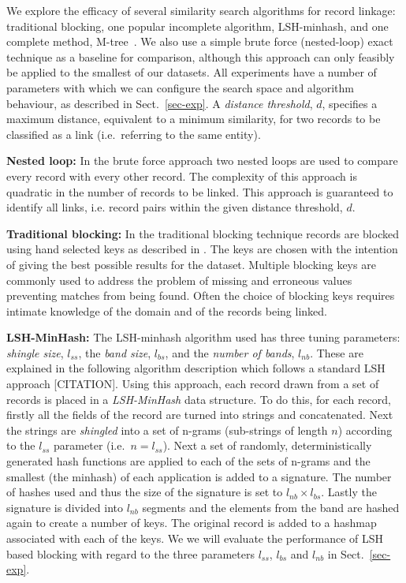\documentclass{llncs}
\begin{document}
We explore the efficacy of several similarity search algorithms for
record linkage: traditional blocking, one popular incomplete algorithm, LSH-minhash, and one complete
method, M-tree~\cite{paolociaccia2m}. We also use a simple brute force
(nested-loop) exact technique as a baseline for comparison, although
this approach can only feasibly be applied to the smallest of our
datasets. All experiments have a number of parameters with which we can
configure the search space and algorithm behaviour, as described in
Sect.~\ref{sec-exp}. A \emph{distance threshold}, $d$, specifies a
maximum distance, equivalent to a minimum similarity, for two records to
be classified as a link (i.e.\ referring to the same entity).

\smallskip
\textbf{Nested loop:}
In the brute force approach two nested loops are used to compare every 
record with every other record. The complexity of this 
approach is quadratic in the number of records to
be linked. This approach is guaranteed to identify all links, i.e. record pairs within the given distance threshold, $d$.

\smallskip
\textbf{Traditional  blocking:}
In the traditional blocking technique records are blocked using hand selected keys as described in \cite{Chr12b}. The keys are chosen with the intention of giving the best possible results for the dataset. Multiple blocking keys are commonly used to address the problem of missing and erroneous values preventing matches from being found. Often the choice of blocking keys requires intimate knowledge of the domain and of the records being linked.


\smallskip
\textbf{LSH-MinHash:}
The LSH-minhash algorithm used has three tuning parameters:
\emph{shingle size}, $l_{ss}$, the \emph{band size}, $l_{bs}$, and the
\emph{number of bands}, $l_{nb}$.
These are explained in the following algorithm description which follows a standard LSH approach [CITATION].
Using this approach, each record drawn from a set of records is placed in a \emph{LSH-MinHash} data structure.
To do this, for each record, firstly all the fields of the record are turned into strings and 
concatenated. Next the strings are \emph{shingled} into a set of
n-grams (sub-strings of length $n$) according to the $l_{ss}$
parameter (i.e.\ $n = l_{ss}$). Next a set of randomly, 
deterministically generated hash functions are applied to each of the
sets of n-grams and the smallest (the minhash) of each application is
added to a signature. The number of hashes used and thus the size of
the signature is set to $l_{nb} \times l_{bs}$.
Lastly the signature is divided into $l_{nb}$ segments and the elements from the band are hashed again to create a number of keys.
The original record is added to a hashmap associated with each of the keys. 
We we will evaluate the performance of LSH based blocking with regard to the three parameters $l_{ss}$, $l_{bs}$ and $l_{nb}$ in
Sect.~\ref{sec-exp}.
\end{document}
